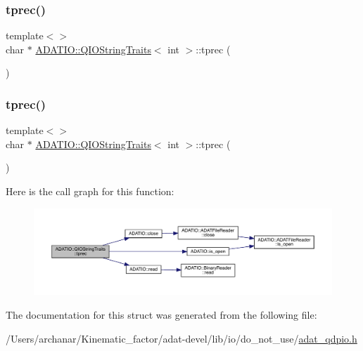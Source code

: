 \mbox{\label{structADATIO_1_1QIOStringTraits_ac52b79fcc02bc184bbc1fb50b7dbf30c}} 
\subsubsection{\texorpdfstring{tprec()}{tprec()}\hspace{0.1cm}{\footnotesize\ttfamily [5/6]}}
{\footnotesize\ttfamily template$<$$>$ \\
char $\ast$ \mbox{\hyperlink{structADATIO_1_1QIOStringTraits}{A\+D\+A\+T\+I\+O\+::\+Q\+I\+O\+String\+Traits}}$<$ int $>$\+::tprec (\begin{DoxyParamCaption}{ }\end{DoxyParamCaption})}

\mbox{\label{structADATIO_1_1QIOStringTraits_ac52b79fcc02bc184bbc1fb50b7dbf30c}} 
\subsubsection{\texorpdfstring{tprec()}{tprec()}\hspace{0.1cm}{\footnotesize\ttfamily [6/6]}}
{\footnotesize\ttfamily template$<$$>$ \\
char $\ast$ \mbox{\hyperlink{structADATIO_1_1QIOStringTraits}{A\+D\+A\+T\+I\+O\+::\+Q\+I\+O\+String\+Traits}}$<$ int $>$\+::tprec (\begin{DoxyParamCaption}{ }\end{DoxyParamCaption})}

Here is the call graph for this function\+:\nopagebreak
\begin{figure}[H]
\begin{center}
\leavevmode
\includegraphics[width=350pt]{de/db0/structADATIO_1_1QIOStringTraits_ac52b79fcc02bc184bbc1fb50b7dbf30c_cgraph}
\end{center}
\end{figure}


The documentation for this struct was generated from the following file\+:\begin{DoxyCompactItemize}
\item 
/\+Users/archanar/\+Kinematic\+\_\+factor/adat-\/devel/lib/io/do\+\_\+not\+\_\+use/\mbox{\hyperlink{adat-devel_2lib_2io_2do__not__use_2adat__qdpio_8h}{adat\+\_\+qdpio.\+h}}\end{DoxyCompactItemize}
